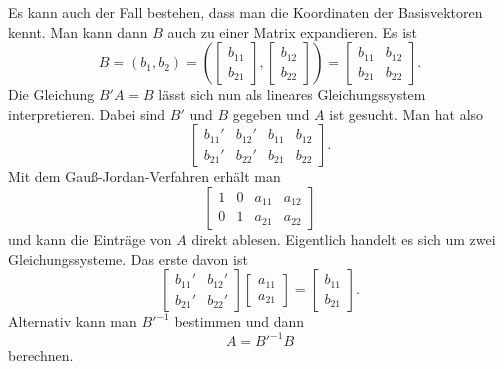 \documentclass[a4paper,11pt,fleqn,twocolumn,twoside]{scrartcl}
\numberwithin{equation}{section}
\begin{document}
Es kann auch der Fall bestehen, dass man die Koordinaten der
Basisvektoren kennt. Man kann dann $B$ auch zu einer Matrix
expandieren. Es ist%
\begin{equation}
B = (b_1,b_2)
= (\begin{bmatrix}b_{11}\\ b_{21}\end{bmatrix},
\begin{bmatrix}b_{12}\\ b_{22}\end{bmatrix})
= \begin{bmatrix}
b_{11} & b_{12}\\
b_{21} & b_{22}
\end{bmatrix}.
\end{equation}
Die Gleichung $B'A=B$ lässt sich nun als lineares Gleichungssystem
interpretieren. Dabei sind $B'$ und $B$ gegeben und $A$ ist
gesucht. Man hat also%
\begin{equation}
\left[\begin{array}{cc|cc}
b_{11}' & b_{12}' & b_{11} & b_{12}\\
b_{21}' & b_{22}' & b_{21} & b_{22}
\end{array}\right].
\end{equation}
Mit dem Gauß-Jordan-Verfahren erhält man%
\begin{equation}
\left[\begin{array}{cc|cc}
1 & 0 & a_{11} & a_{12}\\
0 & 1 & a_{21} & a_{22}
\end{array}\right]
\end{equation}
und kann die Einträge von $A$ direkt ablesen.
Eigentlich handelt es sich um zwei Gleichungssysteme.
Das erste davon ist%
\begin{equation}
\begin{bmatrix}
b_{11}' & b_{12}'\\
b_{21}' & b_{22}'
\end{bmatrix}
\begin{bmatrix}
a_{11}\\ a_{21}
\end{bmatrix}
= \begin{bmatrix}
b_{11}\\ b_{21}
\end{bmatrix}.
\end{equation}
Alternativ kann man $B'^{-1}$ bestimmen und dann%
\begin{equation}
A = B'^{-1}B
\end{equation}
berechnen.
\end{document}
